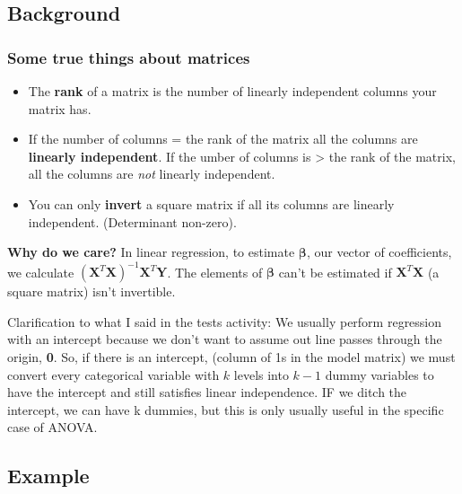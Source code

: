 \documentclass[
  openany]{book}
\providecommand{\tightlist}{%
  \setlength{\itemsep}{0pt}\setlength{\parskip}{0pt}}
\begin{document}
\hypertarget{background}{%
\subsection{Background}\label{background}}

\hypertarget{some-true-things-about-matrices}{%
\subsubsection{Some true things about matrices}\label{some-true-things-about-matrices}}

\begin{itemize}
\tightlist
\item
  The \textbf{rank} of a matrix is the number of linearly independent columns your matrix has.\\
\item
  If the number of columns = the rank of the matrix all the columns are \textbf{linearly independent}. If the umber of columns is \textgreater{} the rank of the matrix, all the columns are \emph{not} linearly independent.\\
\item
  You can only \textbf{invert} a square matrix if all its columns are linearly independent. (Determinant non-zero).
\end{itemize}

\textbf{Why do we care?} In linear regression, to estimate \(\boldsymbol\beta\), our vector of coefficients, we calculate \((\boldsymbol X^T\boldsymbol X)^{-1}\boldsymbol X^T\boldsymbol Y\). The elements of \(\boldsymbol\beta\) can't be estimated if \(\boldsymbol X^T\boldsymbol X\) (a square matrix) isn't invertible.

Clarification to what I said in the tests activity: We usually perform regression with an intercept because we don't want to assume out line passes through the origin, \textbf{0}. So, if there is an intercept, (column of 1s in the model matrix) we must convert every categorical variable with \(k\) levels into \(k-1\) dummy variables to have the intercept and still satisfies linear independence. IF we ditch the intercept, we can have k dummies, but this is only usually useful in the specific case of ANOVA.

\hypertarget{example-3}{%
\subsection{Example}\label{example-3}}
\end{document}
